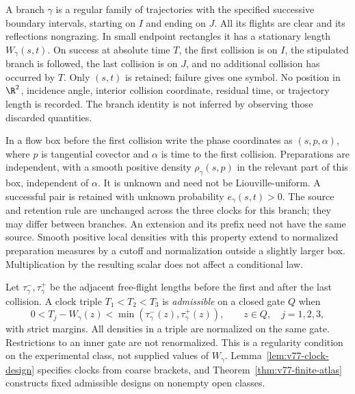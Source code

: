 A branch $\gamma$ is a regular family of trajectories with the specified
successive boundary intervals, starting on $I$ and ending on $J$.  All
its flights are clear and its reflections nongrazing.  In small endpoint
rectangles it has a stationary length $W_\gamma(s,t)$.  On success at
absolute time $T$, the first collision is on $I$, the stipulated branch
is followed, the last collision is on $J$, and no additional collision
has occurred by $T$.  Only $(s,t)$ is retained; failure gives one symbol.
No position in $\R^2$, incidence angle, interior collision coordinate,
residual time, or trajectory length is recorded.  The branch identity
is not inferred by observing those discarded quantities.

In a flow box before the first collision write the phase coordinates as
$(s,p,\alpha)$, where $p$ is tangential covector and $\alpha$ is time
to the first collision.  Preparations are independent, with a smooth
positive density $\rho_\gamma(s,p)$ in the relevant part of this box,
independent of $\alpha$.  It is unknown and need not be Liouville-uniform.
A successful pair is retained with unknown probability
$e_\gamma(s,t)>0$.  The source and retention rule are unchanged across
the three clocks for this branch; they may differ between branches.
An extension and its prefix need not have the same source.  Smooth
positive local densities with this property extend to normalized
preparation measures by a cutoff and normalization outside a slightly
larger box.  Multiplication by the resulting scalar does not affect a
conditional law.

Let $\tau_\gamma^-,\tau_\gamma^+$ be the adjacent free-flight lengths
before the first and after the last collision.  A clock triple
$T_1<T_2<T_3$ is \emph{admissible} on a closed gate $Q$ when
\begin{equation}\label{eq:v77-window}
 0<T_j-W_\gamma(z)
      <\min(\tau_\gamma^-(z),\tau_\gamma^+(z)),\qquad z\in Q,
 \quad j=1,2,3,
\end{equation}
with strict margins.  All densities in a triple are normalized on the
same gate.  Restrictions to an inner gate are not renormalized.  This
is a regularity condition on the experimental class, not supplied values
of $W_\gamma$.  Lemma~\ref{lem:v77-clock-design} specifies clocks from
coarse brackets, and Theorem~\ref{thm:v77-finite-atlas} constructs fixed
admissible designs on nonempty open classes.

